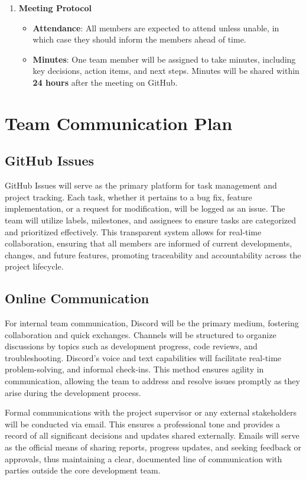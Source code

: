 \documentclass{article}
\begin{document}
\begin{enumerate}[label=\textbf{\arabic*}]
    \item \textbf{Meeting Protocol}
    \begin{itemize}
        \item \textbf{Attendance}: All members are expected to attend unless unable, in which case they should inform the members ahead of time.
        \item \textbf{Minutes}: One team member will be assigned to take minutes, including key decisions, action items, and next steps. Minutes will be shared within \textbf{24 hours} after the meeting on GitHub.
    \end{itemize}

\end{enumerate}


\section{Team Communication Plan}

\subsection*{GitHub Issues}
GitHub Issues will serve as the primary platform for task management and project tracking. Each task, whether it pertains to a bug fix, feature implementation, or a request for modification, will be logged as an issue. The team will utilize labels, milestones, and assignees to ensure tasks are categorized and prioritized effectively. This transparent system allows for real-time collaboration, ensuring that all members are informed of current developments, changes, and future features, promoting traceability and accountability across the project lifecycle.

\subsection*{Online Communication}
For internal team communication, Discord will be the primary medium, fostering collaboration and quick exchanges. Channels will be structured to organize discussions by topics such as development progress, code reviews, and troubleshooting. Discord's voice and text capabilities will facilitate real-time problem-solving, and informal check-ins. This method ensures agility in communication, allowing the team to address and resolve issues promptly as they arise during the development process.

Formal communications with the project supervisor or any external stakeholders will be conducted via email. This ensures a professional tone and provides a record of all significant decisions and updates shared externally. Emails will serve as the official means of sharing reports, progress updates, and seeking feedback or approvals, thus maintaining a clear, documented line of communication with parties outside the core development team.
\end{document}
